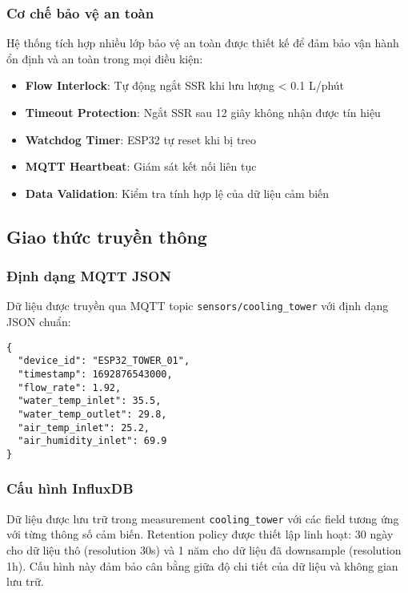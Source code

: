 \documentclass[../main.tex]{subfiles}
\begin{document}
\subsubsection{Cơ chế bảo vệ an toàn}
\label{sec:safety_mechanisms}

Hệ thống tích hợp nhiều lớp bảo vệ an toàn được thiết kế để đảm bảo vận hành ổn định và an toàn trong mọi điều kiện:

\begin{itemize}
\item \textbf{Flow Interlock}: Tự động ngắt SSR khi lưu lượng < 0.1 L/phút
\item \textbf{Timeout Protection}: Ngắt SSR sau 12 giây không nhận được tín hiệu
\item \textbf{Watchdog Timer}: ESP32 tự reset khi bị treo
\item \textbf{MQTT Heartbeat}: Giám sát kết nối liên tục
\item \textbf{Data Validation}: Kiểm tra tính hợp lệ của dữ liệu cảm biến
\end{itemize}

\subsection{Giao thức truyền thông}
\label{sec:app_a_communication_protocols}

\subsubsection{Định dạng MQTT JSON}
\label{sec:mqtt_json_format}

Dữ liệu được truyền qua MQTT topic \texttt{sensors/cooling\_tower} với định dạng JSON chuẩn:

\begin{verbatim}
{
  "device_id": "ESP32_TOWER_01",
  "timestamp": 1692876543000,
  "flow_rate": 1.92,
  "water_temp_inlet": 35.5,
  "water_temp_outlet": 29.8,
  "air_temp_inlet": 25.2,
  "air_humidity_inlet": 69.9
}
\end{verbatim}

\subsubsection{Cấu hình InfluxDB}
\label{sec:influxdb_configuration}

Dữ liệu được lưu trữ trong measurement \texttt{cooling\_tower} với các field tương ứng với từng thông số cảm biến. Retention policy được thiết lập linh hoạt: 30 ngày cho dữ liệu thô (resolution 30s) và 1 năm cho dữ liệu đã downsample (resolution 1h). Cấu hình này đảm bảo cân bằng giữa độ chi tiết của dữ liệu và không gian lưu trữ.
\end{document}

